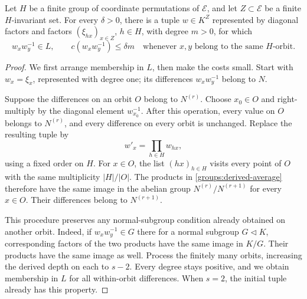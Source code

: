 \begin{lemma}\label{groups:averaging}
Let $H$ be a finite group of coordinate permutations of $\mathcal E$,
and let $Z\subset\mathcal E$ be a finite $H$-invariant set. For every
$\delta>0$, there is a tuple $w\in K^Z$ represented by diagonal
factors and factors $(\xi_{h x})_{x\in Z}$, $h\in H$, with degree
$m>0$, for which
\begin{equation}\label{groups:orbit-bound}
 w_xw_y^{-1}\in L,\qquad c(w_xw_y^{-1})\le\delta m
 \quad\text{whenever }x,y\text{ belong to the same }H\text{-orbit}.
\end{equation}
\end{lemma}
\begin{proof}
We first arrange membership in $L$, then make the costs small.
Start with $w_x=\xi_x$, represented with degree one; its differences
$w_xw_y^{-1}$ belong to $N$.

Suppose the differences on an orbit $O$ belong to $N^{(r)}$.
Choose $x_0\in O$ and right-multiply by the diagonal element
$w_{x_0}^{-1}$.  After this operation, every value on $O$ belongs to
$N^{(r)}$, and every difference on every orbit is unchanged.
Replace the resulting tuple by
\begin{equation}\label{groups:derived-average}
 w'_x=\prod_{h\in H}w_{h x},
\end{equation}
using a fixed order on $H$.  For $x\in O$, the list $(h x)_{h\in H}$
visits every point of $O$ with the same multiplicity $|H|/|O|$.
The products in \eqref{groups:derived-average} therefore have the same
image in the abelian group $N^{(r)}/N^{(r+1)}$ for every $x\in O$.
Their differences belong to $N^{(r+1)}$.

This procedure preserves any normal-subgroup condition already obtained
on another orbit.  Indeed, if $w_xw_y^{-1}\in G$ there for a normal
subgroup $G\lhd K$, corresponding factors of the two products have the
same image in $K/G$.  Their products have the same image as well.
Process the finitely many orbits, increasing the derived depth on each
to $s-2$.  Every degree stays positive, and we obtain membership in $L$
for all within-orbit differences.  When $s=2$, the initial tuple already
has this property.


\end{proof}
